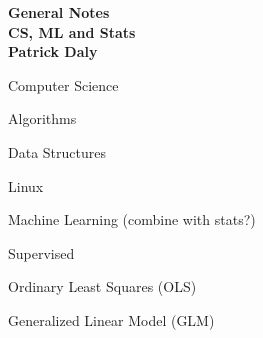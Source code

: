 \documentclass[11pt]{article}
\begin{document}
\begin{center}
  \vspace*{10mm}
  {\bf {\huge General Notes}}\\
  \vspace*{5mm}
  {\bf {CS, ML and Stats}
    \\ \vspace*{2mm} {\large Patrick Daly}
  }
\end{center}

\newpage

\begin{enumerate}

    \begin{item}

      Computer Science

      \begin{enumerate}

          \begin{item}
            Algorithms
          \end{item}

          \begin{item}
            Data Structures
          \end{item}

          \begin{item}
            Linux
          \end{item}

      \end{enumerate}

    \end{item}

    \begin{item}

      Machine Learning (combine with stats?)

      \begin{enumerate}

          \begin{item}

            Supervised

            \begin{enumerate}

                \begin{item}
                  Ordinary Least Squares (OLS)
                \end{item}

                \begin{item}

                  Generalized Linear Model (GLM)


\end{item}
\end{enumerate}
\end{item}
\end{enumerate}
\end{item}
\end{enumerate}
\end{document}
